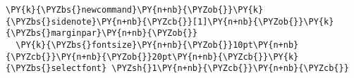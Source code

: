 \begin{Verbatim}[commandchars=\\\{\}]
\PY{k}{\PYZbs{}newcommand}\PY{n+nb}{\PYZob{}}\PY{k}{\PYZbs{}sidenote}\PY{n+nb}{\PYZcb{}}[1]\PY{n+nb}{\PYZob{}}\PY{k}{\PYZbs{}marginpar}\PY{n+nb}{\PYZob{}}
  \PY{k}{\PYZbs{}fontsize}\PY{n+nb}{\PYZob{}}10pt\PY{n+nb}{\PYZcb{}}\PY{n+nb}{\PYZob{}}20pt\PY{n+nb}{\PYZcb{}}\PY{k}{\PYZbs{}selectfont} \PYZsh{}1\PY{n+nb}{\PYZcb{}}\PY{n+nb}{\PYZcb{}}
\end{Verbatim}
